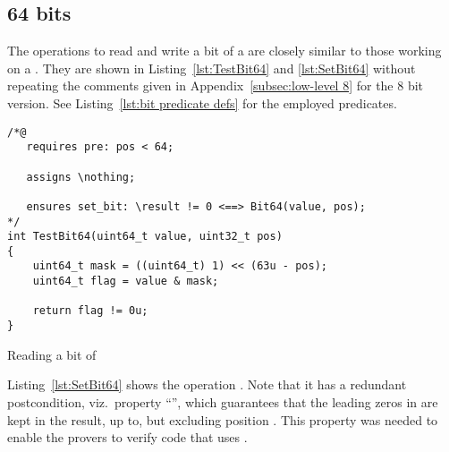 \FloatBarrier

\subsection{64 bits}
\label{subsec:low-level 64}



The operations to read and write a bit of a 
are closely similar to
those working on a .
%
They are shown in Listing~\ref{lst:TestBit64}
and \ref{lst:SetBit64} without repeating the comments given
in Appendix~\ref{subsec:low-level 8} for the 8 bit version.
%
See Listing~\ref{lst:bit predicate defs} for the employed \acsl predicates.





\begin{listing}[hbt]
\begin{minipage}{0.99\textwidth}
\begin{lstlisting}[style=acsl-block]
/*@
   requires pre: pos < 64;

   assigns \nothing;

   ensures set_bit: \result != 0 <==> Bit64(value, pos);
*/
int TestBit64(uint64_t value, uint32_t pos)
{
    uint64_t mask = ((uint64_t) 1) << (63u - pos);
    uint64_t flag = value & mask;

    return flag != 0u;
}
\end{lstlisting}
\end{minipage}
\caption{\label{lst:TestBit64}Reading a bit of }
\end{listing}








Listing~\ref{lst:SetBit64} shows the operation .
%
Note that it has a redundant postcondition, viz.\ property
``'', which guarantees that the leading zeros in
 are kept in the result, up to, but excluding
position .
%
This property was needed to enable the provers to verify code that uses
.




